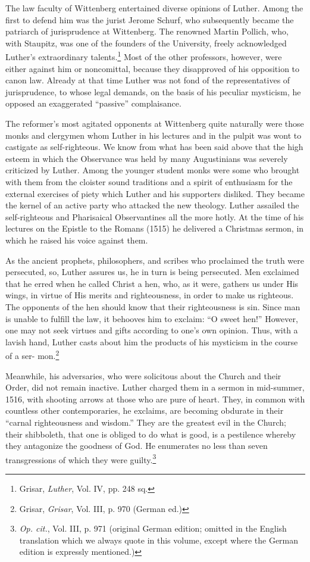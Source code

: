 The law faculty of Wittenberg entertained diverse opinions of
Luther. Among the first to defend him was the jurist Jerome Schurf,
who subsequently became the patriarch of jurisprudence at Wittenberg. The
renowned Martin Pollich, who, with Staupitz, was one of
the founders of the University, freely acknowledged Luther’s extraordinary
talents.\footnote{Grisar, \textit{Luther}, Vol. IV, pp. 248 sq.}
Most of the other professors, however, were either
against him or noncomittal, because they disapproved of his opposition
to canon law. Already at that time Luther was not fond
of the representatives of jurisprudence, to whose legal demands, on
the basis of his peculiar mysticism, he opposed an exaggerated “passive” complaisance.

The reformer’s most agitated opponents at Wittenberg quite naturally
were those monks and clergymen whom Luther in his lectures
and in the pulpit was wont to castigate as self-righteous. We know
from what has been said above that the high esteem in which the
Observance was held by many Augustinians was severely criticized
by Luther. Among the younger student monks were some who brought
with them from the cloister sound traditions and a spirit of enthusiasm
for the external exercises of piety which Luther and his supporters
disliked. They became the kernel of an active party who attacked the
new theology. Luther assailed the self-righteous and Pharisaical Observantines
all the more hotly. At the time of his lectures on the
Epistle to the Romans (1515) he delivered a Christmas sermon, in
which he raised his voice against them.

As the ancient prophets, philosophers, and scribes who proclaimed the
truth were persecuted, so, Luther assures us, he in turn is being persecuted.
Men exclaimed that he erred when he called Christ a hen, who, as it were,
gathers us under His wings, in virtue of His merits and righteousness, in
order to make us righteous. The opponents of the hen should know that
their righteousness is sin. Since man is unable to fulfill the law, it behooves
him to exclaim: “O sweet hen!” However, one may not seek virtues and
gifts according to one’s own opinion. Thus, with a lavish hand, Luther
casts about him the products of his mysticism in the course of a ser-
mon.\footnote{Grisar, \textit{Grisar}, Vol. III, p. 970 (German ed.)}

Meanwhile, his adversaries, who were solicitous about the Church and
their Order, did not remain inactive. Luther charged them in a sermon in
mid-summer, 1516, with shooting arrows at those who are pure of heart.
They, in common with countless other contemporaries, he exclaims, are
becoming obdurate in their “carnal righteousness and wisdom.” They are
the greatest evil in the Church; their shibboleth, that one is obliged to
do what is good, is a pestilence whereby they antagonize the goodness of
God. He enumerates no less than seven transgressions of which they were
guilty.\footnote
{\textit{Op. cit.}, Vol. III, p. 971 (original German edition; omitted in the English translation
which we always quote in this volume, except where the German edition is expressly
mentioned.)}

